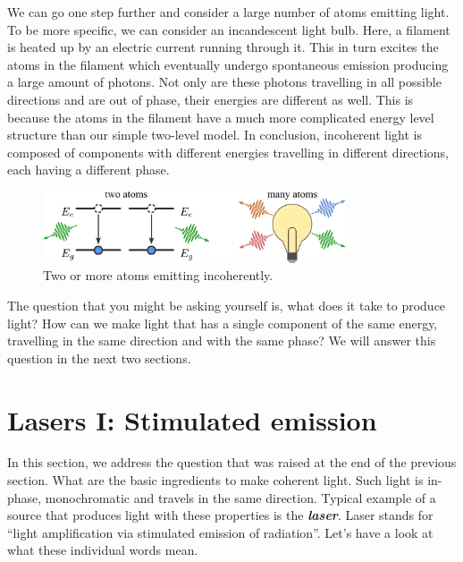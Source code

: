 We can go one step further and consider a large number of atoms emitting light.
To be more specific, we can consider an incandescent light bulb.
Here, a filament is heated up by an electric current running through it.
This in turn excites the atoms in the filament which eventually undergo spontaneous emission producing a large amount of photons.
Not only are these photons travelling in all possible directions and are out of phase, their energies are different as well.
This is because the atoms in the filament have a much more complicated energy level structure than our simple two-level model.
In conclusion, incoherent light is composed of components with different energies travelling in different directions, each having a different phase.

\begin{figure}
    \centering
    \includegraphics[width=0.8\textwidth]{lesson5/5-2_incoherent_emission.pdf}
    \caption[Incoherent emission]{Two or more atoms emitting incoherently.}
    \label{fig:5-2_incoherent_emission}
\end{figure}

The question that you might be asking yourself is, what does it take to produce light?
How can we make light that has a single component of the same energy, travelling in the same direction and with the same phase?
We will answer this question in the next two sections.



\section{Lasers I: Stimulated emission}
\label{sec:5-3_lasers1}


In this section, we address the question that was raised at the end of the previous section.
What are the basic ingredients to make coherent light.
Such light is in-phase, monochromatic and travels in the same direction.
Typical example of a source that produces light with these properties is the \textit{\textbf{laser}}.
Laser stands for ``light amplification via stimulated emission of radiation''.
Let's have a look at what these individual words mean.

